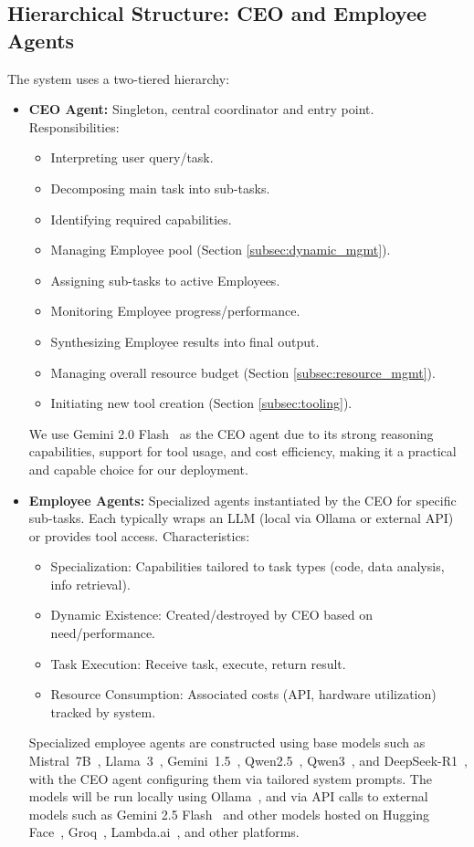 \documentclass[conference]{IEEEtran}
\begin{document}
\subsection{Hierarchical Structure: CEO and Employee Agents}
The system uses a two-tiered hierarchy:

\begin{itemize}
    \item \textbf{CEO Agent:} Singleton, central coordinator and entry point. Responsibilities:
        \begin{itemize}
            \item Interpreting user query/task.
            \item Decomposing main task into sub-tasks.
            \item Identifying required capabilities.
            \item Managing Employee pool (Section \ref{subsec:dynamic_mgmt}).
            \item Assigning sub-tasks to active Employees.
            \item Monitoring Employee progress/performance.
            \item Synthesizing Employee results into final output.
            \item Managing overall resource budget (Section \ref{subsec:resource_mgmt}).
            \item Initiating new tool creation (Section \ref{subsec:tooling}).
        \end{itemize}
        We use Gemini 2.0 Flash~\cite{gemini20flash} as the CEO agent due to its strong reasoning capabilities, support for tool usage, and cost efficiency, making it a practical and capable choice for our deployment. 
    \item \textbf{Employee Agents:} Specialized agents instantiated by the CEO for specific sub-tasks. Each typically wraps an LLM (local via Ollama \cite{ollama} or external API) or provides tool access. Characteristics:
        \begin{itemize}
            \item Specialization: Capabilities tailored to task types (code, data analysis, info retrieval).
            \item Dynamic Existence: Created/destroyed by CEO based on need/performance.
            \item Task Execution: Receive task, execute, return result.
            \item Resource Consumption: Associated costs (API, hardware utilization) tracked by system.
        \end{itemize}
        Specialized employee agents are constructed using base models such as Mistral~7B~\cite{jiang2023mistral}, Llama~3~\cite{llama3herd}, Gemini~1.5~\cite{gemini1.5_report}, Qwen2.5~\cite{qwen2.5_report}, Qwen3~\cite{qwen3_blog}, and DeepSeek-R1~\cite{deepseekr1_report}, with the CEO agent configuring them via tailored system prompts.
        The models will be run locally using Ollama~\cite{ollama}, and via API calls to external models such as Gemini 2.5 Flash~\cite{gemini25flash} and other models hosted on Hugging Face~\cite{huggingface2025}, Groq~\cite{groq2025}, Lambda.ai~\cite{lambda2025}, and other platforms.
\end{itemize}
\end{document}
